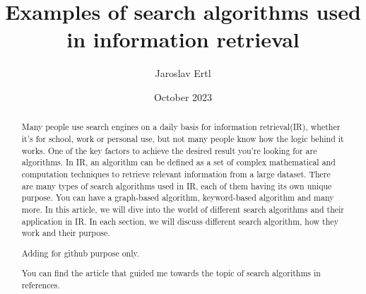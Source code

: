 \documentclass{article}
\title{\textbf{Examples of search algorithms used in information retrieval}}
\author{Jaroslav Ertl}
\date{October 2023}
\begin{document}
\maketitle
 
\begin{abstract}
    Many people use search engines on a daily basis for information retrieval(IR), whether it's for school, work or personal use, but not many people know how the logic behind it works. One of the key factors to achieve the desired result you're looking for are algorithms. In IR, an algorithm can be defined as a set of complex mathematical and computation techniques to retrieve relevant information from a large dataset. There are many types of search algorithms used in IR, each of them having its own unique purpose. You can have a graph-based algorithm, keyword-based algorithm and many more. In this article, we will dive into the world of different search algorithms and their application in IR. In each section, we will discuss different search algorithm, how they work and their purpose.
    
    Adding for github purpose only.


You can find the article that guided me towards the topic of search algorithms in references.\cite{10210566}
\end{abstract}


 
\cite{Chonyy}
\end{document}
